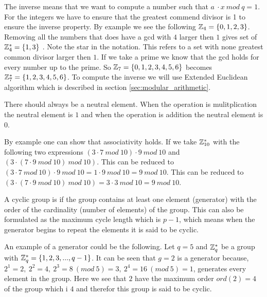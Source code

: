  The inverse means that we want to compute a number such that \begin{math}a\ \cdot x \ mod \ q = 1 \end{math}.  For the integers we have to ensure that the greatest commend divisor is 1 to ensure the inverse property. By example we see the following \begin{math} \mathbb{Z}_4 = \{0,1,2,3\}\end{math}. Removing all the numbers that does have a gcd with $4$ larger then $1$ gives set of $\mathbb{Z}_4^* = \{1,3\}$ . Note the star in the notation. This refers to a set with none greatest common divisor larger then $1$. If we take a prime we know that the gcd holds for every number up to the prime. So  \begin{math} \mathbb{Z}_7 = \{0,1,2,3,4,5,6\}\end{math} becomes \begin{math} \mathbb{Z}_7^* = \{1,2,3,4,5,6\}\end{math}. To compute the inverse we will use Extended Euclidean algorithm which is described in section \ref{sec:modular_arithmetic}.


 There should always be a neutral element. When the operation is mulitplication the neutral element is $1$ and when the operation is addition the neutral element is $0$.

 By example one can show that associativity holds. If we take $ \mathbb{Z}_{10}^*$ with the following two expressions $ (3 \cdot 7 \ mod \ 10) \cdot 9 \ mod \ 10 $ and  $ (3 \cdot ( 7 \cdot 9 \ mod \ 10) \ mod \ 10) $. This can be reduced to $ (3 \cdot 7 \ mod \ 10) \cdot 9 \ mod \ 10 = 1 \cdot 9 \ mod \ 10 = 9 \ mod \ 10$. This can be reduced to $ (3 \cdot ( 7 \cdot 9 \ mod \ 10) \ mod \ 10) = 3 \cdot 3 \ mod \ 10 = 9 \ mod \ 10 $.



 A cyclic group is if the group contains at least one element (generator) with the order of the cardinality (number of elements) of the group. This can also be formulated as the maximum cycle length which is $p-1$, which means when the generator begins to repeat the elements it is said to be cyclic.

 An example of a generator could be the following. Let \begin{math}q=5\end{math} and \begin{math} \mathbb{Z}_q^*\end{math} be a group with \begin{math} \mathbb{Z}_q^* = \{1,2,3,...,q-1\}\end{math}. It can be seen that \begin{math} g=2\end{math} is a generator because,  \begin{math}2^1=2,\ 2^2=4,\ 2^3=8 \ (mod\ 5)=3,\ 2^4=16 \ (mod \ 5)=1 \end{math}, generates every element in the group. Here we see that $2$ have the maximum order $ord(2)=4$ of the group which i $4$ and therefor this group is said to be cyclic.

